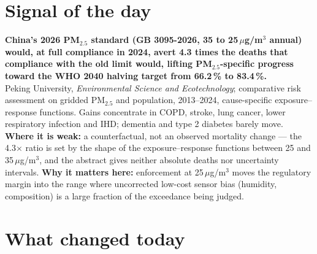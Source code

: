 \documentclass[10pt]{article}
\begin{document}
\vspace{6mm}

\section*{\sffamily\bfseries\color{Deep}Signal of the day}
\vspace{-1.5mm}{\color{Amber}\rule{\linewidth}{1.1pt}}\vspace{2.5mm}

\begin{keybox}
{\sffamily\bfseries\small\color{Deep}China's 2026 PM$_{2.5}$ standard (GB 3095-2026, 35 to 25\,$\mu$g/m$^3$ annual) would, at full compliance in 2024, avert 4.3 times the deaths that compliance with the old limit would, lifting PM$_{2.5}$-specific progress toward the WHO 2040 halving target from 66.2\,\% to 83.4\,\%.}\\[1.4mm]
\footnotesize
Peking University, \textit{Environmental Science and Ecotechnology}; comparative risk assessment on gridded PM$_{2.5}$ and population, 2013--2024, cause-specific exposure--response functions. Gains concentrate in COPD, stroke, lung cancer, lower respiratory infection and IHD; dementia and type 2 diabetes barely move.
\textbf{Where it is weak:} a counterfactual, not an observed mortality change --- the 4.3$\times$ ratio is set by the shape of the exposure--response functions between 25 and 35\,$\mu$g/m$^3$, and the abstract gives neither absolute deaths nor uncertainty intervals.
\textbf{Why it matters here:} enforcement at 25\,$\mu$g/m$^3$ moves the regulatory margin into the range where uncorrected low-cost sensor bias (humidity, composition) is a large fraction of the exceedance being judged.\par
\end{keybox}

\vspace{3mm}

\section*{\sffamily\bfseries\color{Deep}What changed today}
\vspace{-1.5mm}{\color{Amber}\rule{\linewidth}{1.1pt}}\vspace{2.5mm}
\end{document}
